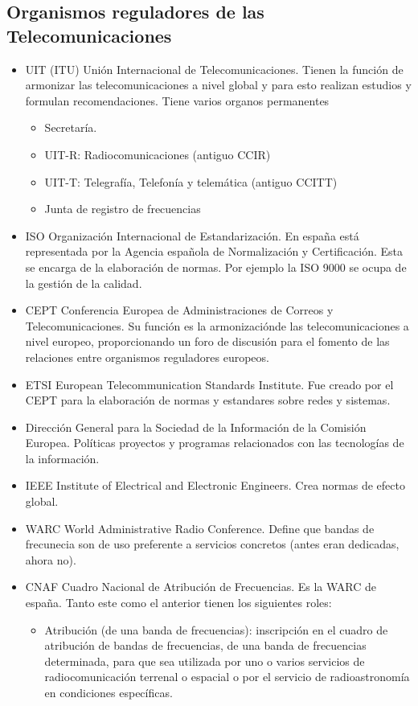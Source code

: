 \subsection{Organismos reguladores de las Telecomunicaciones}
\begin{itemize}
	\item UIT (ITU) Unión Internacional de Telecomunicaciones. Tienen la función de armonizar las telecomunicaciones a nivel global y para esto realizan estudios y formulan recomendaciones. Tiene varios organos permanentes
	\begin{itemize}
		\item Secretaría.
		\item UIT-R: Radiocomunicaciones (antiguo CCIR)
		\item UIT-T: Telegrafía, Telefonía y telemática (antiguo CCITT)
		\item Junta de registro de frecuencias
	\end{itemize}
	\item ISO Organización Internacional de Estandarización. En españa está representada por la Agencia española de Normalización y Certificación. Esta se encarga de la elaboración de normas. Por ejemplo la ISO 9000 se ocupa de la gestión de la calidad.
	\item CEPT Conferencia Europea de Administraciones de Correos y Telecomunicaciones. Su función es la armonizaciónde las telecomunicaciones a nivel europeo, proporcionando un foro de discusión para el fomento de las relaciones entre organismos reguladores europeos. 
	\item ETSI European Telecommunication Standards Institute. Fue creado por el CEPT para la elaboración de normas y estandares sobre redes y sistemas.
	\item Dirección General para la Sociedad de la Información de la Comisión Europea. Políticas proyectos y programas relacionados con las tecnologías de la información.
	\item IEEE Institute of Electrical and Electronic Engineers. Crea normas de efecto global.
	\item WARC World Administrative Radio Conference. Define que bandas de frecunecia son de uso preferente a servicios concretos (antes eran dedicadas, ahora no).
	\item CNAF Cuadro Nacional de Atribución de Frecuencias. Es la WARC de españa. Tanto este como el anterior tienen los siguientes roles:
	\begin{itemize}
		\item Atribución (de una banda de frecuencias): inscripción en el cuadro de atribución de bandas de frecuencias, de una banda de frecuencias determinada, para que sea utilizada por uno o varios servicios de radiocomunicación terrenal o espacial o por el servicio de radioastronomía en condiciones específicas. 

\end{itemize}
\end{itemize}
